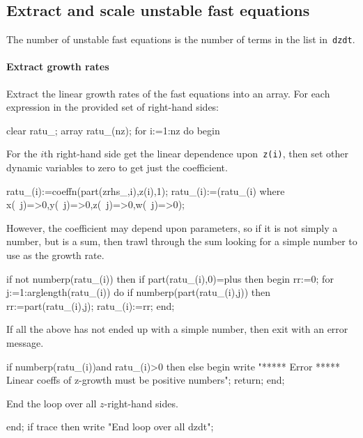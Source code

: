\documentclass[11pt,a5paper]{article}
\begin{document}
\subsection{Extract and scale unstable fast equations}

The number of unstable fast equations is the number of terms
in the list in~\verb|dzdt|.

\paragraph{Extract growth rates}
Extract the linear growth rates of the fast equations into
an array. For each expression in the provided set of
right-hand sides:
\begin{reduce}
clear ratu_; array ratu_(nz);
for i:=1:nz do begin
\end{reduce}

For the $i$th right-hand side get the linear dependence
upon~\verb|z(i)|, then set other dynamic variables to zero
to get just the coefficient.
\begin{reduce}
  ratu_(i):=coeffn(part(zrhs_,i),z(i),1);
  ratu_(i):=(ratu_(i) where 
      {x(~j)=>0,y(~j)=>0,z(~j)=>0,w(~j)=>0});
\end{reduce}

However, the coefficient may depend upon parameters, so if
it is not simply a number, but is a sum, then trawl through
the sum looking for a simple number to use as the growth
rate.
\begin{reduce}
  if not numberp(ratu_(i)) then 
  if part(ratu_(i),0)=plus then begin
    rr:=0;
    for j:=1:arglength(ratu_(i)) do 
      if numberp(part(ratu_(i),j)) 
      then rr:=part(ratu_(i),j);
    ratu_(i):=rr;
  end;
\end{reduce}

If all the above has not ended up with a simple number, then
exit with an error message. 
\begin{reduce}
  if numberp(ratu_(i))and ratu_(i)>0 then
  else begin 
    write "***** Error *****
    Linear coeffs of z-growth must be positive numbers";
    return;
  end;
\end{reduce}

End the loop over all \(z\)-right-hand sides.
\begin{reduce}
end;
if trace then write "End loop over all dzdt";
\end{reduce}
\end{document}
